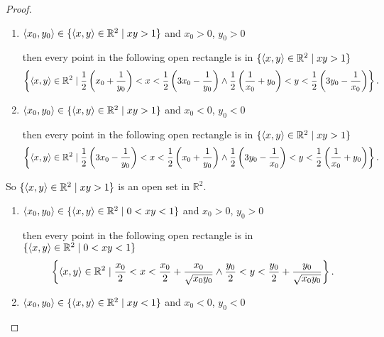 \begin{proof}
\begin{enumerate}[label={(\roman*)}]
		      \begin{enumerate}[label={\textbf{Case \arabic*.}},itemindent=1cm]
			      \item $\left\langle{x_{0}, y_{0}}\right\rangle \in \{ \left\langle{x, y}\right\rangle\in \mathbb{R}^{2} \mid xy > 1 \}$ and $x_{0} > 0$, $y_{0} > 0$

			            then every point in the following open rectangle is in $\{ \left\langle{x, y}\right\rangle\in \mathbb{R}^{2} \mid xy > 1 \}$
			            \[
				            \left\{ \left\langle{x, y}\right\rangle\in \mathbb{R}^{2} \mid \frac{1}{2}\left(x_{0} + \frac{1}{y_{0}}\right) < x < \frac{1}{2}\left(3x_{0} - \frac{1}{y_{0}}\right) \wedge \frac{1}{2}\left(\frac{1}{x_{0}} + y_{0}\right) < y < \frac{1}{2}\left(3y_{0} - \frac{1}{x_{0}}\right)\right\}.
			            \]

			      \item $\left\langle{x_{0}, y_{0}}\right\rangle \in \{ \left\langle{x, y}\right\rangle\in \mathbb{R}^{2} \mid xy > 1 \}$ and $x_{0} < 0$, $y_{0} < 0$

			            then every point in the following open rectangle is in $\{ \left\langle{x, y}\right\rangle\in \mathbb{R}^{2} \mid xy > 1 \}$
			            \[
				            \left\{ \left\langle{x, y}\right\rangle\in \mathbb{R}^{2} \mid \frac{1}{2}\left(3x_{0} - \frac{1}{y_{0}}\right) < x < \frac{1}{2}\left(x_{0} + \frac{1}{y_{0}}\right) \wedge \frac{1}{2}\left(3y_{0} - \frac{1}{x_{0}}\right) < y < \frac{1}{2}\left(\frac{1}{x_{0}} + y_{0}\right)\right\}.
			            \]
		      \end{enumerate}

		      So $\{ \left\langle{x, y}\right\rangle\in \mathbb{R}^{2} \mid xy > 1 \}$ is an open set in $\mathbb{R}^{2}$.

		      \begin{enumerate}[label={\textbf{Case \arabic*.}},itemindent=1cm]
			      \item $\left\langle{x_{0}, y_{0}}\right\rangle \in \{ \left\langle{x, y}\right\rangle\in \mathbb{R}^{2} \mid 0 < xy < 1 \}$ and $x_{0} > 0$, $y_{0} > 0$

			            then every point in the following open rectangle is in $\{ \left\langle{x, y}\right\rangle\in \mathbb{R}^{2} \mid 0 < xy < 1 \}$
			            \[
				            \left\{ \left\langle{x, y}\right\rangle\in \mathbb{R}^{2} \mid \frac{x_{0}}{2} < x < \frac{x_{0}}{2} + \frac{x_{0}}{\sqrt{x_{0}y_{0}}} \wedge \frac{y_{0}}{2} < y < \frac{y_{0}}{2} + \frac{y_{0}}{\sqrt{x_{0}y_{0}}} \right\}.
			            \]

			      \item $\left\langle{x_{0}, y_{0}}\right\rangle \in \{ \left\langle{x, y}\right\rangle\in \mathbb{R}^{2} \mid xy < 1 \}$ and $x_{0} < 0$, $y_{0} < 0$


\end{enumerate}
\end{enumerate}
\end{proof}
